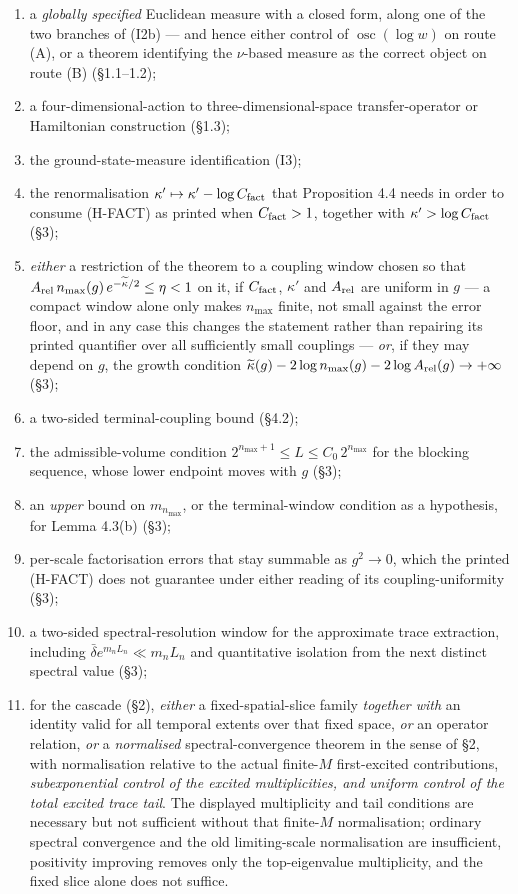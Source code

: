 \documentclass[11pt]{article}
\begin{document}
\begin{enumerate}\setlength{\itemsep}{0pt}
\item a \emph{globally specified} Euclidean measure with a closed form, along one of
the two branches of (I2b) --- and hence either control of $\operatorname{osc}(\log w)$
on route (A), or a theorem identifying the $\nu$-based measure as the correct object
on route (B) (\S1.1--1.2);
\item a four-dimensional-action to three-dimensional-space transfer-operator or
Hamiltonian construction (\S1.3);
\item the ground-state-measure identification (I3);
\item the renormalisation $\kappa'\mapsto\kappa'-\log C_{\rm fact}$ that
Proposition 4.4 needs in order to consume (H-FACT) as printed when $C_{\rm fact}>1$,
together with $\kappa'>\log C_{\rm fact}$ (\S3);
\item \emph{either} a restriction of the theorem to a coupling window chosen so
that $A_{\rm rel}\,n_{\max}(g)\,e^{-\widetilde\kappa/2}\le\eta<1$ on it, if
$C_{\rm fact}$, $\kappa'$ and $A_{\rm rel}$ are uniform in $g$ --- a compact window
alone only makes $n_{\max}$ finite, not small against the error floor, and in any case
this changes the statement rather than repairing its printed quantifier over all
sufficiently small couplings --- \emph{or}, if they may depend on $g$, the growth
condition
$\widetilde\kappa(g)-2\log n_{\max}(g)-2\log A_{\rm rel}(g)\to+\infty$ (\S3);
\item a two-sided terminal-coupling bound (\S4.2);
\item the admissible-volume condition $2^{n_{\max}+1}\le L\le C_0\,2^{n_{\max}}$ for
the blocking sequence, whose lower endpoint moves with $g$ (\S3);
\item an \emph{upper} bound on $m_{n_{\max}}$, or the terminal-window condition as a
hypothesis, for Lemma 4.3(b) (\S3);
\item per-scale factorisation errors that stay summable as $g^2\to0$, which the
printed (H-FACT) does not guarantee under either reading of its
coupling-uniformity (\S3);
\item {\sloppy a two-sided spectral-resolution window for the approximate
trace extraction, including $\bar\delta e^{m_nL_n}\ll m_nL_n$ and
quantitative isolation from the next distinct spectral value (\S3);\par}
\item for the cascade (\S2), \emph{either} a fixed-spatial-slice family
\emph{together with} an identity valid for all temporal extents over that fixed space,
\emph{or} an operator relation, \emph{or} a \emph{normalised} spectral-convergence
 theorem in the sense of \S2, with normalisation relative to the actual finite-$M$
 first-excited contributions, \emph{subexponential control of the excited
 multiplicities, and uniform control of the total excited trace tail}.  The displayed
 multiplicity and tail conditions are necessary but not sufficient without that
 finite-$M$ normalisation; ordinary spectral convergence and the old limiting-scale
 normalisation are insufficient, positivity improving removes only the
 top-eigenvalue multiplicity, and the fixed slice alone does not suffice.
\end{enumerate}
\end{document}
